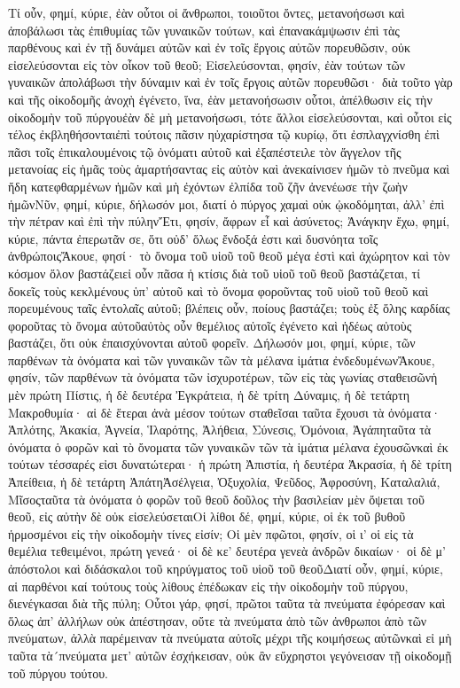 Τί οὖν, φημί, κύριε, ἐὰν οὗτοι οἱ ἄνθρωποι, τοιοῦτοι ὄντες, μετανοήσωσι καὶ ἀποβάλωσι τὰς ἐπιθυμίας τῶν γυναικῶν τούτων, καὶ ἐπανακάμψωσιν ἐπὶ τὰς παρθένους καὶ ἐν τῇ δυνάμει αὐτῶν καὶ ἐν τοῖς ἔργοις αὐτῶν πορευθῶσιν, οὐκ εἰσελεύσονται εἰς τὸν οἶκον τοῦ θεοῦ; Εἰσελεύσονται, φησίν, ἐὰν τούτων τῶν γυναικῶν ἀπολάβωσι τὴν δύναμιν καὶ ἐν τοῖς ἔργοις αὐτῶν πορευθῶσι· διὰ τοῦτο γὰρ καὶ τῆς οἰκοδομῆς ἀνοχὴ ἐγένετο, ἵνα, ἐὰν μετανοήσωσιν οὗτοι, ἀπέλθωσιν εἰς τὴν οἰκοδομὴν τοῦ πύργουἐὰν δὲ μὴ μετανοήσωσι, τότε ἄλλοι εἰσελεύσονται, καὶ οὗτοι εἰς τέλος ἐκβληθήσονταιἐπὶ τούτοις πᾶσιν ηὐχαρίστησα τῷ κυρίῳ, ὅτι ἐσπλαγχνίσθη ἐπὶ πᾶσι τοῖς ἐπικαλουμένοις τῷ ὀνόματι αὐτοῦ καὶ ἐξαπέστειλε τὸν ἄγγελον τῆς μετανοίας εἰς ἡμᾶς τοὺς ἁμαρτήσαντας εἰς αὐτὸν καὶ ἀνεκαίνισεν ἡμῶν τὸ πνεῦμα καὶ ἤδη κατεφθαρμένων ἡμῶν καὶ μὴ ἐχόντων ἐλπίδα τοῦ ζῆν ἀνενέωσε τὴν ζωὴν ἡμῶνΝῦν, φημί, κύριε, δήλωσόν μοι, διατί ὁ πύργος χαμαὶ οὐκ ᾠκοδόμηται, ἀλλ’ ἐπὶ τὴν πέτραν καὶ ἐπὶ τὴν πύληνἜτι, φησίν, ἄφρων εἶ καὶ ἀσύνετος; Ἀνάγκην ἔχω, φημί, κύριε, πάντα ἐπερωτᾶν σε, ὅτι οὐδ’ ὅλως ἔνδοξά ἐστι καὶ δυσνόητα τοῖς ἀνθρώποιςἌκουε, φησί· τὸ ὄνομα τοῦ υἱοῦ τοῦ θεοῦ μέγα ἐστὶ καὶ ἀχώρητον καὶ τὸν κόσμον ὅλον βαστάζειεἰ οὖν πᾶσα ἡ κτίσις διὰ τοῦ υἱοῦ τοῦ θεοῦ βαστάζεται, τί δοκεῖς τοὺς κεκλμένους ὑπ’ αὐτοῦ καὶ τὸ ὄνομα φοροῦντας τοῦ υἱοῦ τοῦ θεοῦ καὶ πορευμένους ταῖς ἐντολαῖς αὐτοῦ; βλέπεις οὖν, ποίους βαστάζει; τοὺς ἐξ ὅλης καρδίας φοροῦτας τὸ ὄνομα αὐτοῦαὐτὸς οὖν θεμέλιος αὐτοῖς ἐγένετο καὶ ἡδέως αὐτοὺς βαστάζει, ὅτι οὐκ ἐπαισχύνονται αὐτοῦ φορεῖν.
Δήλωσόν μοι, φημί, κύριε, τῶν παρθένων τὰ ὀνόματα καὶ τῶν γυναικῶν τῶν τὰ μέλανα ἱμάτια ἐνδεδυμένωνἌκουε, φησίν, τῶν παρθένων τὰ ὀνόματα τῶν ἰσχυροτέρων, τῶν εἰς τὰς γωνίας σταθεισῶνἡ μὲν πρώτη Πίστις, ἡ δὲ δευτέρα Ἐγκράτεια, ἡ δὲ τρίτη Δύναμις, ἡ δὲ τετάρτη Μακροθυμία· αἱ δὲ ἕτεραι ἀνὰ μέσον τούτων σταθεῖσαι ταῦτα ἔχουσι τὰ ὀνόματα· Ἁπλότης, Ἀκακία, Ἁγνεία, Ἱλαρότης, Ἀλήθεια, Σύνεσις, Ὁμόνοια, Ἀγάπηταῦτα τὰ ὀνόματα ὁ φορῶν καὶ τὸ ὄνοματα τῶν γυναικῶν τῶν τὰ ἱμάτια μέλανα ἐχουσῶνκαὶ ἐκ τούτων τέσσαρές εἰσι δυνατώτεραι· ἡ πρώτη Ἀπιστία, ἡ δευτέρα Ἀκρασία, ἡ δὲ τρίτη Ἀπείθεια, ἡ δὲ τετάρτη ἈπάτηἈσέλγεια, Ὀξυχολία, Ψεῦδος, Ἀφροσύνη, Καταλαλιά, Μῖσοςταῦτα τὰ ὀνόματα ὁ φορῶν τοῦ θεοῦ δοῦλος τὴν βασιλείαν μὲν ὄψεται τοῦ θεοῦ, εἰς αὐτὴν δὲ οὐκ εἰσελεύσεταιΟἱ λίθοι δέ, φημί, κύριε, οἱ ἐκ τοῦ βυθοῦ ἡρμοσμένοι εἰς τὴν οἰκοδομὴν τίνες εἰσίν; Οἱ μὲν πφῶτοι, φησίν, οἱ ι’ οἱ εἰς τὰ θεμέλια τεθειμένοι, πρώτη γενεά· οἱ δὲ κε’ δευτέρα γενεὰ ἀνδρῶν δικαίων· οἱ δὲ μ’ ἀπόστολοι καὶ διδάσκαλοι τοῦ κηρύγματος τοῦ υἱοῦ τοῦ θεοῦΔιατί οὖν, φημί, κύριε, αἱ παρθένοι καί τούτους τοὺς λίθους ἐπέδωκαν εἰς τὴν οἰκοδομὴν τοῦ πύργου, διενέγκασαι διὰ τῆς πύλη; Οὗτοι γάρ, φησί, πρῶτοι ταῦτα τὰ πνεύματα ἐφόρεσαν καὶ ὅλως ἀπ’ ἀλλήλων οὐκ ἀπέστησαν, οὔτε τὰ πνεύματα ἀπὸ τῶν ἀνθρωποι ἀπὸ τῶν πνεύματων, ἀλλὰ παρέμειναν τὰ πνεύματα αὐτοῖς μέχρι τῆς κοιμήσεως αὐτῶνκαὶ εἰ μὴ ταῦτα τὰ´πνεύματα μετ’ αὐτῶν ἐσχήκεισαν, οὐκ ἂν εὔχρηστοι γεγόνεισαν τῇ οἰκοδομῇ τοῦ πύργου τούτου.
